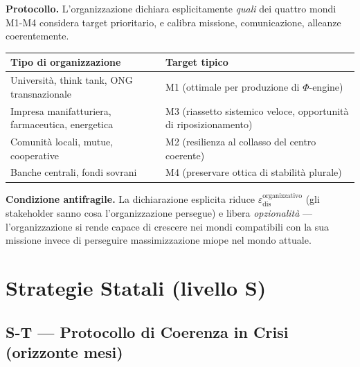 \Hypoth{} \textbf{Protocollo.} L'organizzazione dichiara esplicitamente
\emph{quali} dei quattro mondi M1-M4 considera target prioritario, e
calibra missione, comunicazione, alleanze coerentemente.

{\def\LTcaptype{none} %
{\small\begin{longtable}[]{@{}
  >{\raggedright\arraybackslash}p{}
  >{\raggedright\arraybackslash}p{}@{}}
\toprule\noalign{}
\begin{minipage}[b]{\linewidth}\raggedright
Tipo di organizzazione
\end{minipage} & \begin{minipage}[b]{\linewidth}\raggedright
Target tipico
\end{minipage} \\
\midrule\noalign{}
\endhead
\bottomrule\noalign{}
\endlastfoot
Università, think tank, ONG transnazionale & M1 (ottimale per produzione
di \(\Phi\)-engine) \\
Impresa manifatturiera, farmaceutica, energetica & M3 (riassetto
sistemico veloce, opportunità di riposizionamento) \\
Comunità locali, mutue, cooperative & M2 (resilienza al collasso del
centro coerente) \\
Banche centrali, fondi sovrani & M4 (preservare ottica di stabilità
plurale) \\
\end{longtable}}
}

\Proved{} \textbf{Condizione antifragile.} La dichiarazione esplicita
riduce \(\varepsilon_{\text{dis}}^{\text{organizzativo}}\) (gli
stakeholder sanno cosa l'organizzazione persegue) e libera
\emph{opzionalità} --- l'organizzazione si rende capace di crescere nei
mondi compatibili con la sua missione invece di perseguire
massimizzazione miope nel mondo attuale.



\section{Strategie Statali (livello
S)}\label{strategie-statali-livello-s}

\subsection{S-T --- Protocollo di Coerenza in Crisi (orizzonte
mesi)}\label{s-t-protocollo-di-coerenza-in-crisi-orizzonte-mesi}

